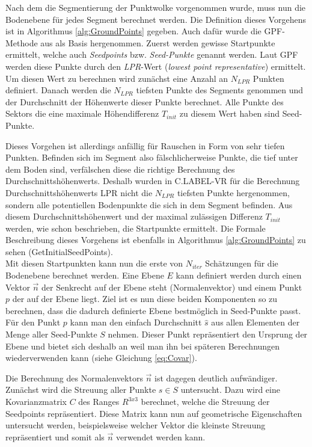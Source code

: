 Nach dem die Segmentierung der Punktwolke vorgenommen wurde, muss nun die Bodenebene für jedes Segment berechnet werden. Die Definition dieses Vorgehens ist in Algorithmus \ref{alg:GroundPoints} gegeben. Auch dafür wurde die GPF-Methode aus \cite{bib:Segmentation1} als Basis hergenommen. Zuerst werden gewisse Startpunkte ermittelt, welche auch \textit{Seedpoints} bzw. \textit{Seed-Punkte} genannt werden. Laut GPF werden diese Punkte durch den \textit{LPR}-Wert (\textit{lowest point representative}) ermittelt. Um diesen Wert zu berechnen wird zunächst eine Anzahl an  $N_{LPR}$ Punkten definiert. Danach werden die $N_{LPR}$ tiefsten Punkte des Segments genommen und der Durchschnitt der Höhenwerte dieser Punkte berechnet. Alle Punkte des Sektors die eine maximale Höhendifferenz $T_{init}$ zu diesem Wert haben sind Seed-Punkte. 

Dieses Vorgehen ist allerdings anfällig für Rauschen in Form von sehr tiefen Punkten. Befinden sich im Segment also fälschlicherweise Punkte, die tief unter dem Boden sind, verfälschen diese die richtige Berechnung des Durchschnittshöhenwerts. Deshalb wurden in C.LABEL-VR für die Berechnung Durchschnittshöhenwerts LPR nicht die $N_{LPR}$ tiefsten Punkte hergenommen, sondern alle potentiellen Bodenpunkte die sich in dem Segment befinden. Aus diesem Durchschnittshöhenwert und der maximal zulässigen Differenz $T_{init}$ werden, wie schon beschrieben, die Startpunkte ermittelt. Die Formale Beschreibung dieses Vorgehens ist ebenfalls in Algorithmus \ref{alg:GroundPoints} zu sehen (GetInitialSeedPoints).\\

Mit diesen Startpunkten kann nun die erste von $N_{iter}$ Schätzungen für die Bodenebene berechnet werden. Eine Ebene $E$ kann definiert werden durch einen Vektor $\vec{n}$ der Senkrecht auf der Ebene steht (Normalenvektor) und einem Punkt $p$ der auf der Ebene liegt. Ziel ist es nun diese beiden Komponenten so zu berechnen, dass die dadurch definierte Ebene bestmöglich in Seed-Punkte passt. Für den Punkt $p$ kann man den einfach Durchschnitt $\hat{s}$ aus allen Elementen der Menge aller Seed-Punkte $S$ nehmen. Dieser Punkt repräsentiert den Ursprung der Ebene und bietet sich deshalb an weil man ihn bei späteren Berechnungen wiederverwenden kann (siehe Gleichung \ref{eq:Covar}).

Die Berechnung des Normalenvektors $\vec{n}$ ist dagegen deutlich aufwändiger. Zunächst wird die Streuung aller Punkte $s \in S$ untersucht. Dazu wird eine Kovarianzmatrix $C$ des Ranges $R^{3x3}$ berechnet, welche die Streuung der Seedpoints repräsentiert. Diese Matrix kann nun auf geometrische Eigenschaften untersucht werden, beispielsweise welcher Vektor die kleinste Streuung repräsentiert und somit als $\vec{n}$ verwendet werden kann.

